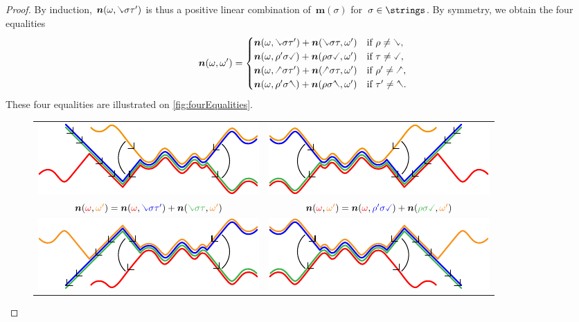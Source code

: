 \documentclass{amsart}
\theoremstyle{definition}
\renewcommand{\b}[1]{{\boldsymbol{#1}}} %
\newcommand{\red}{\color{red}} %
\newcommand{\blue}{\color{blue}} %
\newcommand{\orange}{\color{orange}} %
\newcommand{\green}{\color{green}} %
\newcommand{\hL}{\text{\rotatebox[origin=c]{180}{\checked}}}
\newcommand{\hR}{\text{\rotatebox[origin=c]{180}{\reflectbox{\checked}}}}
\newcommand{\cL}{\text{\reflectbox{\checked}}}
\newcommand{\cR}{\text{\checked}}
\begin{document}
\begin{proof}
By induction, $\b{n}(\omega, \cL \sigma \tau')$ is thus a positive linear combination of~$\b{m}(\sigma)$ for~$\sigma \in \strings$.
%
By symmetry, we obtain the four equalities
\[
\b{n}(\omega, \omega') = 
\begin{cases}
\b{n}(\omega, \cL \sigma \tau') + \b{n}(\cL \sigma \tau, \omega') & \text{if } \rho \ne \cL, \\
\b{n}(\omega, \rho' \sigma \cR) + \b{n}(\rho \sigma \cR, \omega') & \text{if } \tau \ne \cR, \\
\b{n}(\omega, \hL \sigma \tau') + \b{n}(\hL \sigma \tau, \omega') & \text{if } \rho' \ne \hL, \\
\b{n}(\omega, \rho' \sigma \hR) + \b{n}(\rho \sigma \hR, \omega') & \text{if } \tau' \ne \hR.
\end{cases}
\]
These four equalities are illustrated on \cref{fig:fourEqualities}.
%
\begin{figure}[t]
	\capstart
	\begin{adjustbox}{center}
    	\begin{tabular}{c@{\qquad}c}
    		\includegraphics[scale=1.2]{fourEqualities1} & \includegraphics[scale=1.2]{fourEqualities2} \\
    		$\b{n}({\red \omega}, {\orange \omega'}) = \b{n}({\red \omega}, {\blue \cL \sigma \tau'}) + \b{n}({\green \cL \sigma \tau}, {\orange \omega'})$ & $\b{n}({\red \omega}, {\orange \omega'}) = \b{n}({\red \omega}, {\blue \rho' \sigma \cR}) + \b{n}({\green \rho \sigma \cR}, {\orange \omega'})$ \\[.4cm]
    		\includegraphics[scale=1.2]{fourEqualities3} & \includegraphics[scale=1.2]{fourEqualities4} \\

\end{tabular}
\end{adjustbox}
\end{figure}
\end{proof}
\end{document}
